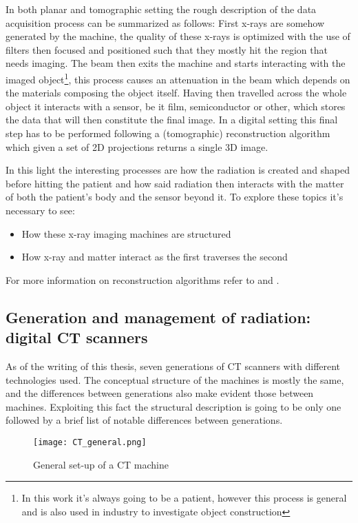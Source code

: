 In both planar and tomographic setting the rough description of the data acquisition process can be summarized as follows: First x-rays are somehow generated by the machine, the quality of these x-rays is optimized with the use of filters then focused and positioned such that they mostly hit the region that needs imaging. The beam then exits the machine and starts interacting with the imaged object\footnote{In this work it's always going to be a patient, however this process is general and is also used in industry to investigate object construction}, this process causes an attenuation in the beam which depends on the materials composing the object itself. Having then travelled across the whole object it interacts with a sensor, be it film, semiconductor or other, which stores the data that will then constitute the final image. In a digital setting this final step has to be performed following a (tomographic) reconstruction algorithm which given a set of 2D projections returns a single 3D image.

In this light the interesting processes are how the radiation is created and shaped before hitting the patient and how said radiation then interacts with the matter of both the patient's body and the sensor beyond it. To explore these topics it's necessary to see:

\begin{itemize}
\item How these x-ray imaging machines are structured
\item How x-ray and matter interact as the first traverses the second
\end{itemize}

For more information on reconstruction algorithms refer to \cite{xray_reconstruction} and \cite{PhysicsMedicalImaging}.

\subsection{Generation and management of radiation: digital CT scanners}

As of the writing of this thesis, seven generations of CT scanners with different technologies used. The conceptual structure of the machines is mostly the same, and the differences between generations also make evident those between machines. Exploiting this fact the structural description is going to be only one followed by a brief list of notable differences between generations.

\begin{figure}[H]
\centering
  		\texttt{[image: CT\_general.png]}
        \caption{General set-up of a CT machine\label{fig:CT-machine}}
\end{figure}

